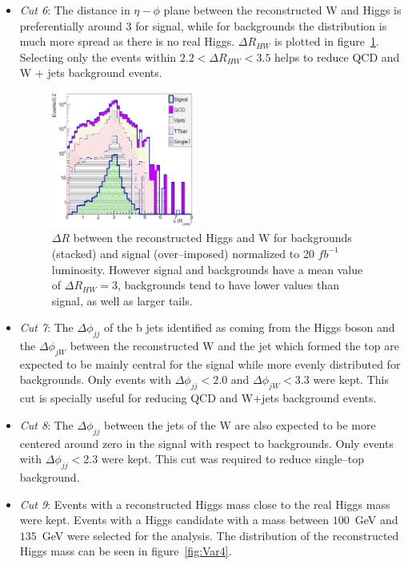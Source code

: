 \begin{itemize}
\item \textit{Cut 6}: The distance in $\eta-\phi$ plane between the reconstructed W and Higgs is preferentially around 3 for signal, while for backgrounds the distribution is much more spread as there is no real Higgs. $\Delta R_{HW}$ is plotted in figure~\ref{fig:Var3}. Selecting only the events within $2.2<\Delta R_{HW}<3.5$ helps to reduce QCD and W + jets background events.

\begin{figure}[!Hhtbp]
  \begin{center}
    \includegraphics[width=0.45\textwidth]{figs/Pheno/DRWH.png}
    \caption{$\Delta R$ between the reconstructed Higgs and W for backgrounds (stacked) and signal (over--imposed) normalized to 20 $fb^{-1}$ luminosity. However signal and backgrounds have a mean value of $\Delta R_{HW}=3$, backgrounds tend to have lower values than signal, as well as larger tails.}
    \label{fig:Var3}
  \end{center}
\end{figure}

\item \textit{Cut 7}: The $\Delta \phi_{jj}$ of the b jets identified as coming from the Higgs boson and the $\Delta \phi_{jW}$ between the reconstructed W and the jet which formed the top are expected to be mainly central for the signal while more evenly distributed for backgrounds. Only events with $\Delta \phi_{jj}<2.0$ and $\Delta \phi_{jW}<3.3$ were kept. This cut is specially useful for reducing QCD and W+jets background events.

\item \textit{Cut 8}: The $\Delta \phi_{jj}$ between the jets of the W are also expected to be more centered around zero in the signal with respect to backgrounds. Only events with $\Delta \phi_{jj}<2.3$ were kept. This cut was required to reduce single--top background.

\item \textit{Cut 9}: Events with a reconstructed Higgs mass close to the real Higgs mass were kept. Events with a Higgs candidate with a mass between $100$~GeV and $135$~GeV were selected for the analysis. The distribution of the reconstructed Higgs mass can be seen in figure~\ref{fig:Var4}.


\end{itemize}
